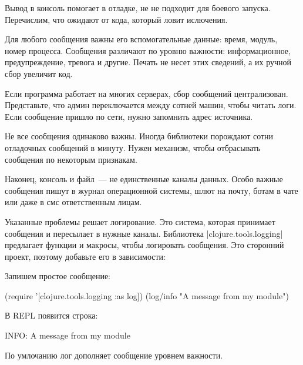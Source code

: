 Вывод в консоль помогает в отладке, не не подходит для боевого
запуска. Перечислим, что ожидают от кода, который ловит ислючения.

Для любого сообщения важны его вспомогательные данные: время, модуль, номер
процесса. Сообщения различают по уровню важности: информационное,
предупреждение, тревога и другие. Печать не несет этих сведений, а их ручной
сбор увеличит код.

Если программа работает на многих серверах, сбор сообщений
централизован. Представьте, что админ переключается между сотней машин, чтобы
читать логи. Если сообщение пришло по сети, нужно запомнить адрес источника.


Не все сообщения одинаково важны. Иногда библиотеки порождают сотни отладочных
сообщений в минуту. Нужен механизм, чтобы отбрасывать сообщения по некоторым
признакам.

Наконец, консоль и файл~--- не единственные каналы данных. Особо важные
сообщения пишут в журнал операционной системы, шлют на почту, ботам в чате или
даже в смс ответственным лицам.

Указанные проблемы решает логирование. Это система, которая принимает сообщения
и пересылает в нужные каналы. Библиотека \spverb|clojure.tools.logging|
предлагает функции и макросы, чтобы логировать сообщения. Это сторонний проект,
поэтому добавьте его в зависимости:

\begin{english}
  \begin{clojure}
  \end{clojure}
\end{english}

\noindent
Запишем простое сообщение:

\begin{english}
  \begin{clojure}
(require '[clojure.tools.logging :as log])
(log/info "A message from my module")
  \end{clojure}
\end{english}

\noindent
В REPL появится строка:

\begin{english}
  \begin{text}
INFO: A message from my module
  \end{text}
\end{english}

\noindent
По умлочанию лог дополняет сообщение уровнем важности.


